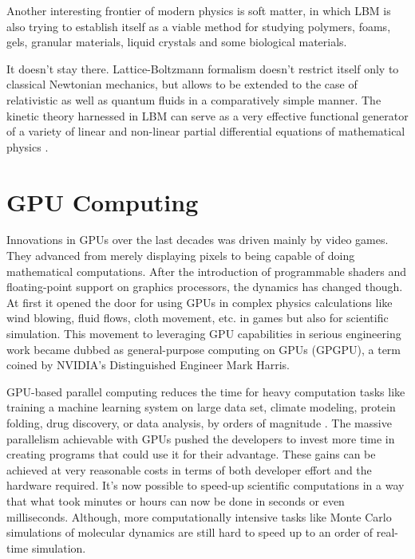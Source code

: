 Another interesting frontier of modern physics is soft matter, in which LBM is also trying to establish itself as a viable method for studying polymers, foams, gels, granular materials, liquid crystals and some biological materials.

It doesn't stay there. Lattice-Boltzmann formalism doesn't restrict itself only to classical Newtonian mechanics, but allows to be extended to the case of relativistic as well as quantum fluids in a comparatively simple manner. The kinetic theory harnessed in LBM can serve as a very effective functional generator of a variety of linear and non-linear partial differential equations of mathematical physics \citep{succi2018}.


\section{GPU Computing}\label{gpu-computing}
Innovations in GPUs over the last decades was driven mainly by video games. They advanced from merely displaying pixels to being capable of doing mathematical computations. After the introduction of programmable shaders and floating-point support on graphics processors, the dynamics has changed though. At first it opened the door for using GPUs in complex physics calculations like wind blowing, fluid flows, cloth movement, etc. in games but also for scientific simulation. This movement to leveraging GPU capabilities in serious engineering work became dubbed as general-purpose computing on GPUs (GPGPU), a term coined by NVIDIA's Distinguished Engineer Mark Harris.

GPU-based parallel computing reduces the time for heavy computation tasks like training a machine learning system on large data set, climate modeling, protein folding, drug discovery, or data analysis, by orders of magnitude \citep{stortiCUDAEngineersIntroduction2016, PACHECO20111}. The massive parallelism achievable with GPUs pushed the developers to invest more time in creating programs that could use it for their advantage. These gains can be achieved at very reasonable costs in terms of both developer effort and the hardware required. It's now possible to speed-up scientific computations in a way that what took minutes or hours can now be done in seconds or even milliseconds. Although, more computationally intensive tasks like Monte Carlo simulations of molecular dynamics are still hard to speed up to an order of real-time simulation.

